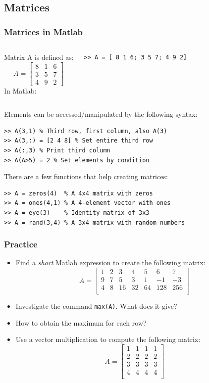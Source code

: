 \documentclass[11pt,table,final,fleqn,xcolor={usenames,dvipsnames},unknownkeysallowed,handout]{beamer}
\begin{document}
\subsection*{Matrices}
\begin{frame}[fragile]
  \frametitle{Matrices in Matlab}
  \begin{columns}[T]
    Matrix A is defined as:
    \[
    A = \begin{bmatrix}
      8 & 1 & 6 \\
      3 & 5 & 7 \\
      4 & 9 & 2
    \end{bmatrix}\]
    \pause
    In Matlab:
  \begin{lstlisting}
>> A = [ 8 1 6; 3 5 7; 4 9 2]
  \end{lstlisting}
  \end{columns}
  \pause
  Elements can be accessed/manipulated by the following syntax:
  \begin{lstlisting}
>> A(3,1) % Third row, first column, also A(3)
>> A(3,:) = [2 4 8] % Set entire third row
>> A(:,3) % Print third column
>> A(A>5) = 2 % Set elements by condition
  \end{lstlisting}\pause
  There are a few functions that help creating matrices:
  \begin{lstlisting}
>> A = zeros(4)  % A 4x4 matrix with zeros
>> A = ones(4,1) % A 4-element vector with ones
>> A = eye(3)    % Identity matrix of 3x3
>> A = rand(3,4) % A 3x4 matrix with random numbers
  \end{lstlisting}
\end{frame}

\begin{frame}[fragile]
 \frametitle{Practice}
 \begin{itemize}
  \item Find a \emph{short} Matlab expression to create the following matrix:
  \[
   A = \begin{bmatrix}
        1 & 2 & 3 & 4 & 5 & 6 & 7\\
        9 & 7 & 5 & 3 & 1 & -1 & -3 \\
        4 & 8 & 16 & 32 & 64 & 128 & 256 \\
       \end{bmatrix}
  \]\pause
  \item Investigate the command \lstinline$max(A)$. What does it give?
  \item How to obtain the maximum for each row?
  \item Use a vector multiplication to compute the following matrix:
    \[
   A = \begin{bmatrix}
	1 & 1 & 1 & 1 \\
        2 & 2 & 2 & 2 \\
        3 & 3 & 3 & 3 \\
        4 & 4 & 4 & 4 \\
       \end{bmatrix}
  \]
 \end{itemize}
\end{frame}
\end{document}
